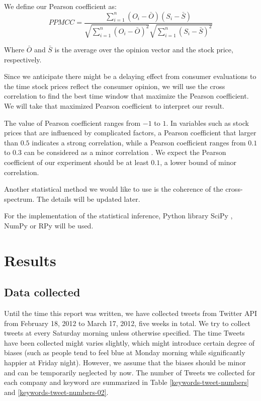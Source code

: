 \documentclass[12pt]{article}
\begin{document}
We define our Pearson coefficient as:
$$
PPMCC = \frac{\sum_{i=1}^{n}(O_i - \bar{O})(S_i - \bar{S})}{\sqrt{\sum_{i=1}^{n}(O_i - \bar{O})^2}\sqrt{\sum_{i=1}^{n}(S_i - \bar{S})^2}}
$$

Where $\bar{O}$ and $\bar{S}$ is the average over the opinion vector and the stock price, respectively.

Since we anticipate there might be a delaying effect from consumer evaluations to the time stock prices reflect the consumer opinion, we will use the cross correlation to find the best time window that maximize the Pearson coefficient. We will take that maximized Pearson coefficient to interpret our result.

The value of Pearson coefficient ranges from $-1$ to $1$. In variables such as stock prices that are influenced by complicated factors, a Pearson coefficient that larger than $0.5$ indicates a strong correlation, while a Pearson coefficient ranges from $0.1$ to $0.3$ can be considered as a minor correlation \cite{Cohen:1988}. We expect the Pearson coefficient of our experiment should be at least $0.1$, a lower bound of minor correlation.

Another statistical method we would like to use is the coherence of the cross-spectrum. The details will be updated later.

For the implementation of the statistical inference, Python library SciPy \cite{SciPy}, NumPy \cite{NumPy} or RPy \cite{RPy} will be used.

\section{Results}

\subsection{Data collected}
Until the time this report was written, we have collected tweets from Twitter API from February 18, 2012 to March 17, 2012, five weeks in total. We try to collect tweets at every Saturday morning unless otherwise specified. The time Tweets have been collected might varies slightly, which might introduce certain degree of biases (such as people tend to feel blue at Monday morning while significantly happier at Friday night). However, we assume that the biases should be minor and can be temporarily neglected by now. The number of Tweets we collected for each company and keyword are summarized in Table \ref{keywords-tweet-numbers} and \ref{keywords-tweet-numbers-02}.
\end{document}
